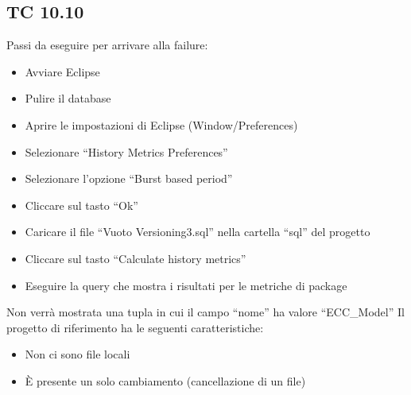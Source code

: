 \subsection*{TC 10.10}
Passi da eseguire per arrivare alla failure:
\begin{itemize}
 \item Avviare Eclipse
 \item Pulire il database
 \item Aprire le impostazioni di Eclipse (Window/Preferences)
 \item Selezionare ``History Metrics Preferences''
 \item Selezionare l'opzione ``Burst based period''
 \item Cliccare sul tasto ``Ok''
 \item Caricare il file ``Vuoto Versioning3.sql'' nella cartella ``sql'' del progetto
 \item Cliccare sul tasto ``Calculate history metrics''
 \item Eseguire la query che mostra i risultati per le metriche di package
\end{itemize}
Non verrà mostrata una tupla in cui il campo ``nome'' ha valore ``ECC\_Model''
\vspace{0.5cm}
\newline
Il progetto di riferimento ha le seguenti caratteristiche:
\begin{itemize}
 \item Non ci sono file locali
 \item È presente un solo cambiamento (cancellazione di un file)
\end{itemize}





\newpage





